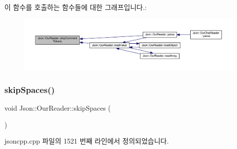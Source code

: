 이 함수를 호출하는 함수들에 대한 그래프입니다.\+:\nopagebreak
\begin{figure}[H]
\begin{center}
\leavevmode
\includegraphics[width=350pt]{class_json_1_1_our_reader_a856dea44d92578c276856d7a65a4ebdc_icgraph}
\end{center}
\end{figure}
\mbox{\label{class_json_1_1_our_reader_a6fbc6d58a4505e5ccadf330b57b17ca5}} 
\subsubsection{\texorpdfstring{skip\+Spaces()}{skipSpaces()}}
{\footnotesize\ttfamily void Json\+::\+Our\+Reader\+::skip\+Spaces (\begin{DoxyParamCaption}{ }\end{DoxyParamCaption})\hspace{0.3cm}{\ttfamily [private]}}



jsoncpp.\+cpp 파일의 1521 번째 라인에서 정의되었습니다.


